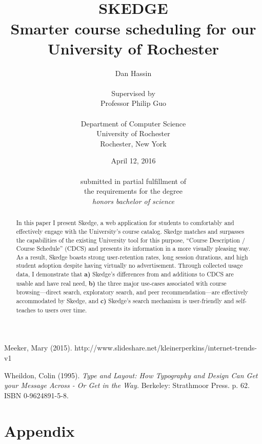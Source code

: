 \documentclass[titlepage]{report}
\title{
\vspace{60pt}\\
\huge \bfseries SKEDGE
\\
\vspace{10pt}
\Large
Smarter course scheduling for our\\
University of Rochester
}
\author{
	Dan Hassin\\
    \vspace{5pt}\\
    Supervised by\\
    Professor Philip Guo\\
    \vspace{2pt}\\
    Department of Computer Science\\
    University of Rochester\\
    Rochester, New York\\
}
\date{April 12, 2016\\
    \vspace{150pt}\\
    submitted in partial fulfillment of\\
    the requirements for the degree\\
    \emph{honors bachelor of science}\\
}
\begin{document}
\maketitle


\onehalfspacing

\setcounter{tocdepth}{1}
\tableofcontents

\listoftables

\listoffigures

\clearpage


\doublespacing


\begin{abstract}

\thispagestyle{plain}

In this paper I present Skedge, a web application for students to comfortably and effectively engage with the University's course catalog. Skedge matches and surpasses the capabilities of the existing University tool for this purpose, ``Course Description / Course Schedule'' (CDCS) and presents its information in a more visually pleasing way. As a result, Skedge boasts strong user-retention rates, long session durations, and high student adoption despite having virtually no advertisement. Through collected usage data, I demonstrate that \textbf{a)} Skedge's differences from and additions to CDCS are usable and have real need, \textbf{b)} the three major use-cases associated with course browsing---direct search, exploratory search, and peer recommendation---are effectively accommodated by Skedge, and \textbf{c)} Skedge's search mechanism is user-friendly and self-teaches to users over time.

\end{abstract}




\setlength{\skip\footins}{0.75cm}



\clearpage


\clearpage


\clearpage

% 
\clearpage


\clearpage

\begin{thebibliography}{1}

	 Meeker, Mary (2015). http://www.slideshare.net/kleinerperkins/internet-trends-v1

     Wheildon, Colin (1995). \emph{Type and Layout: How Typography and Design Can Get your Message Across - Or Get in the Way.} Berkeley: Strathmoor Press. p. 62. ISBN 0-9624891-5-8.

\end{thebibliography}


\clearpage
\section*{Appendix}
\end{document}
